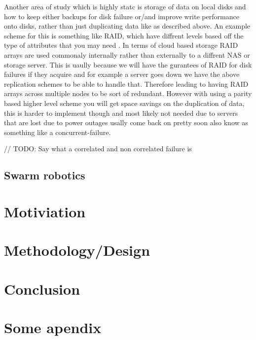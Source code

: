 \documentclass{UoYCSproject}
\begin{document}
Another area of study which is highly statc is storage of data on local disks and how to keep either backups for disk failure or/and improve write performance onto disks, rather than just duplicating data like as described above.
An example scheme for this is something like RAID, which have diffrent levels based off the type of 	attributes that you may need \cite{RAID Levels}.
In terms of cloud based storage RAID arrays are used commonaly internally rather than externally to a diffrent NAS or storage server.
This is uaully because we will have the gurantees of RAID for disk failures if they acquire and for example a server goes down we have the above replication schemes to be able to handle that.
Therefore leading to having RAID arrays across multiple nodes to be sort of redundant.
However with using a parity \cite{Raid parity} based higher level scheme you will get space savings on the duplication of data, this is harder to implement though and most likely not needed due to servers that are lost due to power outages usally come back on pretty soon also know as something like a concurrent-failure.

// TODO: Say what a correlated and non correlated failure is

\section{Swarm robotics}
\label{sec:Robotics}



\chapter{Motiviation}
\label{cha:Motivation}


\chapter{Methodology/Design}
\label{cha:Methodology/Design}


\chapter{Conclusion}
\label{cha:conclusion}


\appendix
\chapter{Some apendix}
\end{document}
